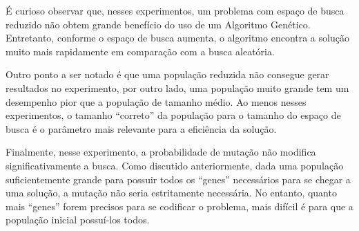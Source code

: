 \documentclass{llncs}
\begin{document}
É curioso observar que, nesses experimentos, um problema com espaço de busca reduzido não obtem grande benefício do uso de um Algoritmo Genético. Entretanto, conforme o espaço de busca aumenta, o algoritmo encontra a solução muito mais rapidamente em comparação com a busca aleatória.

Outro ponto a ser notado é que uma população reduzida não consegue gerar resultados no experimento, por outro lado, uma população muito grande tem um desempenho pior que a população de tamanho médio. Ao menos nesses experimentos, o tamanho \enquote{correto} da população para o tamanho do espaço de busca é o parâmetro mais relevante para a eficiência da solução.

Finalmente, nesse experimento, a probabilidade de mutação não modifica significativamente a busca. Como discutido anteriormente, dada uma população suficientemente grande para possuir todos os \enquote{genes} necessários para se chegar a uma solução, a mutação não seria estritamente necessária. No entanto, quanto mais \enquote{genes} forem precisos para se codificar o problema, mais difícil é para que a população inicial possuí-los todos.
\end{document}
